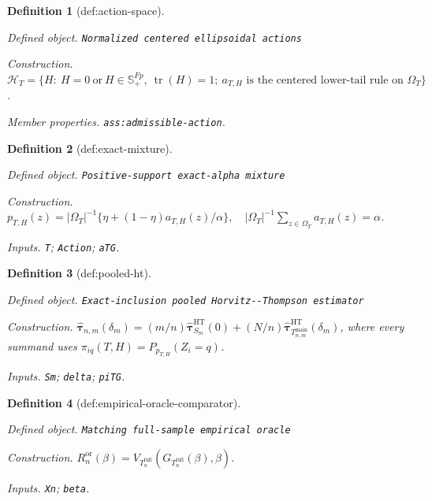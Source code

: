 \documentclass{article}
\newtheorem{definition}{Definition}
\begin{document}
\begin{definition}[def:action-space]\label{def:action-space}
\par\smallskip\noindent\emph{Defined object.} \texttt{Normalized centered ellipsoidal actions}
\par\smallskip\noindent\emph{Construction.} \(\mathcal H_T=\{H:\ H=0\ \text{or}\ H\in\mathbb S_{+}^{Fp},\ \operatorname{tr}(H)=1;\ a_{T,H}\text{ is the centered lower-tail rule on }\Omega_T\}\).
\par\smallskip\noindent\emph{Member properties.} \texttt{ass:\allowbreak{}admissible-\allowbreak{}action}.
\end{definition}

\begin{definition}[def:exact-mixture]\label{def:exact-mixture}
\par\smallskip\noindent\emph{Defined object.} \texttt{Positive-\allowbreak{}support exact-\allowbreak{}alpha mixture}
\par\smallskip\noindent\emph{Construction.} \(p_{T,H}(z)=|\Omega_T|^{-1}\{\eta+(1-\eta)a_{T,H}(z)/\alpha\},\quad |\Omega_T|^{-1}\sum_{z\in\Omega_T}a_{T,H}(z)=\alpha\).
\par\smallskip\noindent\emph{Inputs.} \texttt{T}; \texttt{Action}; \texttt{aTG}.
\end{definition}

\begin{definition}[def:pooled-ht]\label{def:pooled-ht}
\par\smallskip\noindent\emph{Defined object.} \texttt{Exact-\allowbreak{}inclusion pooled Horvitz-\allowbreak{}-\allowbreak{}Thompson estimator}
\par\smallskip\noindent\emph{Construction.} \(\widehat{\boldsymbol\tau}_{n,m}(\delta_m)=(m/n)\widehat{\boldsymbol\tau}^{\mathrm{HT}}_{S_m}(0)+(N/n)\widehat{\boldsymbol\tau}^{\mathrm{HT}}_{T_{n,m}^{\mathrm{main}}}(\delta_m)\), where every summand uses \(\pi_{iq}(T,H)=P_{p_{T,H}}(Z_i=q)\).
\par\smallskip\noindent\emph{Inputs.} \texttt{Sm}; \texttt{delta}; \texttt{piTG}.
\end{definition}

\begin{definition}[def:empirical-oracle-comparator]\label{def:empirical-oracle-comparator}
\par\smallskip\noindent\emph{Defined object.} \texttt{Matching full-\allowbreak{}sample empirical oracle}
\par\smallskip\noindent\emph{Construction.} \(R_n^{\mathrm{or}}(\beta)=V_{T_n^{\mathrm{full}}}(G_{T_n^{\mathrm{full}}}(\beta),\beta)\).
\par\smallskip\noindent\emph{Inputs.} \texttt{Xn}; \texttt{beta}.
\end{definition}
\end{document}
